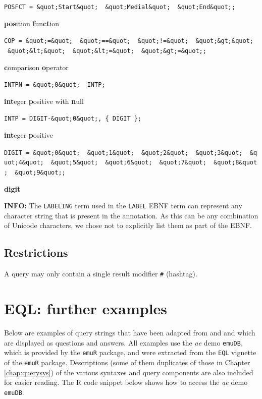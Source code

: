 \documentclass[]{book}
\theoremstyle{definition}
\theoremstyle{definition}
\theoremstyle{definition}
\theoremstyle{remark}
\begin{document}
\texttt{POSFCT\ =\ \&quot;Start\&quot;\ \textbar{}\ \&quot;Medial\&quot;\ \textbar{}\ \&quot;End\&quot;;}

\textbf{pos}ition \textbf{f}un\textbf{ct}ion

\texttt{COP\ =\ \&quot;=\&quot;\ \textbar{}\ \&quot;==\&quot;\ \textbar{}\ \&quot;!=\&quot;\ \textbar{}\ \&quot;\&gt;\&quot;\ \textbar{}\ \&quot;\&lt;\&quot;\ \textbar{}\ \&quot;\&lt;=\&quot;\ \textbar{}\ \&quot;\&gt;=\&quot;;}

\textbf{c}omparison \textbf{o}perator

\texttt{INTPN\ =\ \&quot;0\&quot;\ \textbar{}\ INTP;}

\textbf{int}eger \textbf{p}ositive with \textbf{n}ull

\texttt{INTP\ =\ DIGIT-\&quot;0\&quot;,\ \{\ DIGIT\ \};}

\textbf{int}eger \textbf{p}ositive

\texttt{DIGIT\ =\ \&quot;0\&quot;\ \textbar{}\ \&quot;1\&quot;\ \textbar{}\ \&quot;2\&quot;\ \textbar{}\ \&quot;3\&quot;\ \textbar{}\ \&quot;4\&quot;\ \textbar{}\ \&quot;5\&quot;\ \textbar{}\ \&quot;6\&quot;\ \textbar{}\ \&quot;7\&quot;\ \textbar{}\ \&quot;8\&quot;\ \textbar{}\ \&quot;9\&quot;;}

\textbf{digit}

\textbf{INFO:} The \texttt{LABELING} term used in the \texttt{LABEL}
EBNF term can represent any character string that is present in the
annotation. As this can be any combination of Unicode characters, we
chose not to explicitly list them as part of the EBNF.

\hypertarget{restrictions}{%
\section{Restrictions}\label{restrictions}}

A query may only contain a single result modifier \texttt{\#} (hashtag).

\hypertarget{app-chap:eql}{%
\chapter{EQL: further examples}\label{app-chap:eql}}

Below are examples of query strings that have been adapted from
\citet{cassidy:sc2001a} and \citet{harrington:2002aa} and which are
displayed as questions and answers. All examples use the \emph{ae} demo
\texttt{emuDB}, which is provided by the \texttt{emuR} package, and were
extracted from the \texttt{EQL} vignette of the \texttt{emuR} package.
Descriptions (some of them duplicates of those in Chapter
\ref{chap:querysys}) of the various syntaxes and query components are
also included for easier reading. The R code snippet below shows how to
access the \emph{ae} demo \texttt{emuDB}.
\end{document}
